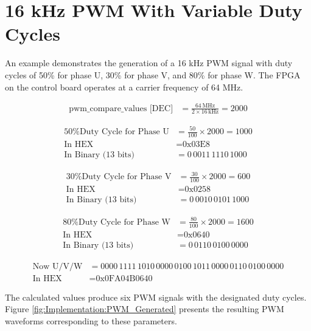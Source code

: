 \chapter{16 kHz PWM With Variable Duty Cycles}
\label{ch:appendix:PWM_calculations}

An example demonstrates the generation of a 16 kHz PWM signal with duty cycles of 50\% for phase U, 30\% for phase V, and 80\% for phase W. The FPGA on the control board operates at a carrier frequency of 64 MHz.

\begin{equation*}
	\begin{aligned}
		\text{pwm\_compare\_values [DEC]} &= \frac{64\,\text{MHz}}{2 \times 16\,\text{kHz}} = 2000
	\end{aligned}
\end{equation*}

\begin{equation*}
	\begin{aligned}
		\text{50\% Duty Cycle for Phase U} &= \frac{50}{100} \times 2000 = 1000 \\
		\text{In HEX} &= \text{0x03E8} \\
		\text{In Binary (13 bits)} &= 0\,0011\,1110\,1000
	\end{aligned}
\end{equation*}

\begin{equation*}
	\begin{aligned}
		\text{30\% Duty Cycle for Phase V} &= \frac{30}{100} \times 2000 = 600 \\
		\text{In HEX} &= \text{0x0258} \\
		\text{In Binary (13 bits)} &= 0\,0010\,0101\,1000
	\end{aligned}
\end{equation*}

\begin{equation*}
	\begin{aligned}
		\text{80\% Duty Cycle for Phase W} &= \frac{80}{100} \times 2000 = 1600 \\
		\text{In HEX} &= \text{0x0640} \\
		\text{In Binary (13 bits)} &= 0\,0110\,0100\,0000
	\end{aligned}
\end{equation*}

\begin{equation*}
	\begin{aligned}
		\text{Now U/V/W} &= 0000\,1111\,1010\,0000\,0100\,1011\,0000\,0110\,0100\,0000 \\
		\text{In HEX} &= \text{0x0FA04B0640}
	\end{aligned}
\end{equation*}

The calculated values produce six PWM signals with the designated duty cycles. Figure \ref{fig:Implementation:PWM_Generated} presents the resulting PWM waveforms corresponding to these parameters.